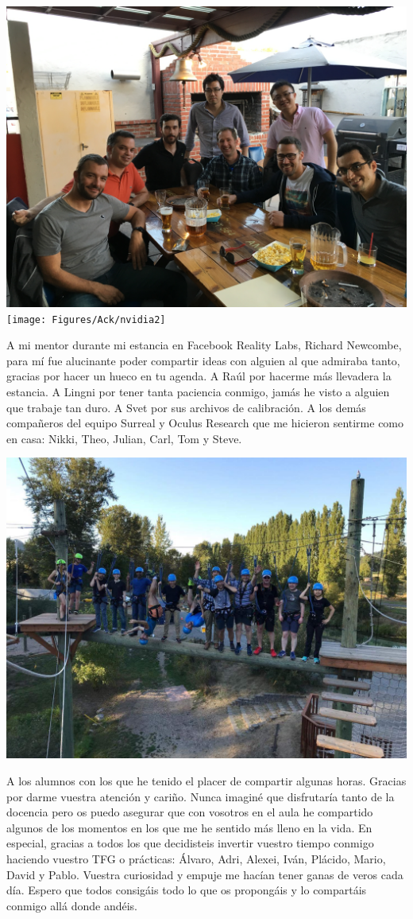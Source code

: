 \begin{center}
\includegraphics[width=0.44\linewidth]{Figures/Ack/nvidia}
\texttt{[image: Figures/Ack/nvidia2]}
\end{center}

A mi mentor durante mi estancia en Facebook Reality Labs, Richard Newcombe, para mí fue alucinante poder compartir ideas con alguien al que admiraba tanto, gracias por hacer un hueco en tu agenda. A Raúl por hacerme más llevadera la estancia. A Lingni por tener tanta paciencia conmigo, jamás he visto a alguien que trabaje tan duro. A Svet por sus archivos de calibración. A los demás compañeros del equipo Surreal y Oculus Research que me hicieron sentirme como en casa: Nikki, Theo, Julian, Carl, Tom y Steve.

\begin{center}
\includegraphics[width=0.6\linewidth]{Figures/Ack/frl2}
\end{center}

A los alumnos con los que he tenido el placer de compartir algunas horas. Gracias por darme vuestra atención y cariño. Nunca imaginé que disfrutaría tanto de la docencia pero os puedo asegurar que con vosotros en el aula he compartido algunos de los momentos en los que me he sentido más lleno en la vida. En especial, gracias a todos los que decidisteis invertir vuestro tiempo conmigo haciendo vuestro TFG o prácticas: Álvaro, Adri, Alexei, Iván, Plácido, Mario, David y Pablo. Vuestra curiosidad y empuje me hacían tener ganas de veros cada día. Espero que todos consigáis todo lo que os propongáis y lo compartáis conmigo allá donde andéis.

